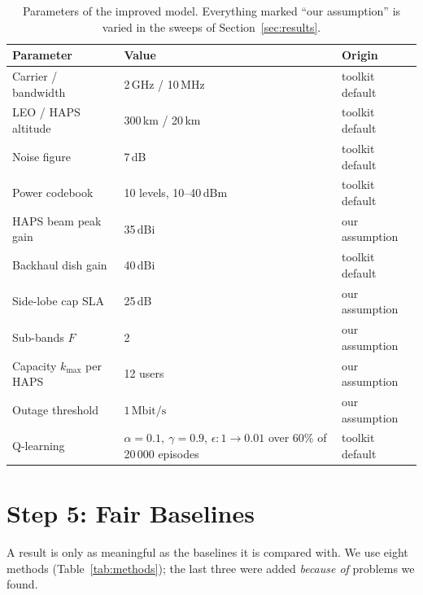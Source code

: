 \documentclass[11pt,a4paper]{article}
\newcommand{\Mbps}{\,\mathrm{Mbit/s}}
\begin{document}
\begin{table}[h]
\centering\small
\begin{tabular}{lll}
\toprule
\textbf{Parameter} & \textbf{Value} & \textbf{Origin}\\
\midrule
Carrier / bandwidth & 2\,GHz / 10\,MHz & toolkit default\\
LEO / HAPS altitude & 300\,km / 20\,km & toolkit default\\
Noise figure & 7\,dB & toolkit default\\
Power codebook & 10 levels, 10--40\,dBm & toolkit default\\
HAPS beam peak gain & 35\,dBi & our assumption\\
Backhaul dish gain & 40\,dBi & toolkit default\\
Side-lobe cap SLA & 25\,dB & our assumption\\
Sub-bands $F$ & 2 & our assumption\\
Capacity $k_{\max}$ per HAPS & 12 users & our assumption\\
Outage threshold & $1\Mbps$ & our assumption\\
Q-learning & $\alpha=0.1,\ \gamma=0.9$, $\epsilon:1\to0.01$ over 60\% of 20\,000 episodes & toolkit default\\
\bottomrule
\end{tabular}
\caption{Parameters of the improved model. Everything marked ``our assumption'' is varied in the sweeps of Section~\ref{sec:results}.}
\label{tab:params}
\end{table}

\section{Step 5: Fair Baselines}
\label{sec:baselines}

A result is only as meaningful as the baselines it is compared with. We use eight methods (Table~\ref{tab:methods}); the last three were added \emph{because of} problems we found.
\end{document}
